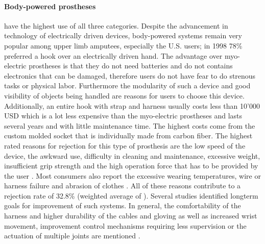 \documentclass[main]{subfiles}
\begin{document}
\paragraph{Body-powered prostheses} have the highest use of all three categories. Despite the advancement in technology of electrically driven devices, body-powered systems remain very popular among upper limb amputees, especially the U.S. users; in 1998 78\% preferred a hook over an electrically driven hand\cite{LeBlanc1998}. The advantage over myo-electric prostheses is that they do not need batteries and do not contains electronics that can be damaged, therefore users do not have fear to do strenous tasks or physical labor. Furthermore the modularity of such a device and good visibility of objects being handled are reasons for users to choose this device\cite{Millstein1986}. Additionally, an entire hook with strap and harness usually costs less than 10'000 USD which is a lot less expensive than the myo-electric prostheses and lasts several years and with little maintenance time. The highest costs come from the custom molded socket that is individually made from carbon fiber. The highest rated reasons for rejection for this type of prosthesis are the low speed of the device, the awkward use, difficulty in cleaning and maintenance, excessive weight, insufficient grip strength and the high operation force that has to be provided by the user \cite{Millstein1986,Keijlaa1993}. Most consumers also report the excessive wearing temperatures, wire or harness failure and abrasion of clothes \cite{vanLunteren1983,Keijlaa1993,Bhaskaranand2003,Dudkiewicz2004}.
All of these reasons contribute to a rejection rate of 32.8\% (weighted average of \cite{Scotland1983,Kruger1993,Crandall2002,vanLunteren1983,Millstein1986,Silcox1993,Keijlaa1993,Pinzur1994,Bhaskaranand2003,Dudkiewicz2004}).
Several studies identified longterm goals for improvement of such systems. In general, the comfortability of the harness and higher durability of the cables and gloving as well as increased wrist movement, improvement control mechanisms requiring less supervision or the actuation of multiple joints are mentioned \cite{Atkins1996}. 
\end{document}
